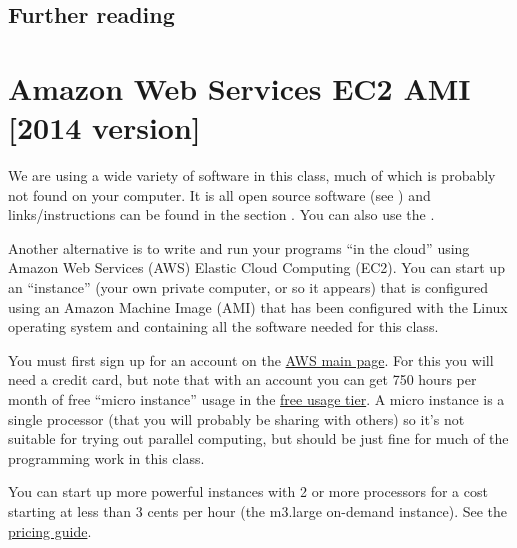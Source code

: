\documentclass[letterpaper,10pt,english]{sphinxmanual}
\begin{document}
\subsection{Further reading}
\label{vm:further-reading}
\label{vm:id2}{\hyperref[biblio:virtualbox]{\crossref{{[}VirtualBox{]}}}}
\label{vm:id3}{\hyperref[biblio:virtualbox\string-documentation]{}}


\section{Amazon Web Services EC2 AMI {[}2014 version{]}}
\label{aws:aws}\label{aws:amazon-web-services-ec2-ami-2014-version}\label{aws::doc}
We are using a wide variety of software in this class, much of which is
probably not found on your computer.  It is all open source software (see
) and links/instructions
can be found in the section {\hyperref[software_installation:software\string-installation]{}}.
You can also use the {\hyperref[vm:vm]{}}.

Another alternative is to write and run your programs ``in the cloud''
using Amazon Web Services (AWS) Elastic Cloud Computing (EC2).
You can start up an ``instance'' (your own private computer, or so it appears)
that is configured using an Amazon Machine Image (AMI) that has been
configured with the Linux operating system and containing
all the software needed for this class.

You must first sign up for an account  on the \href{http://aws.amazon.com/}{AWS main page}.  For this you will need a credit
card, but note that with an account you can get 750 hours per month of
free ``micro instance'' usage in the
\href{http://aws.amazon.com/free/}{free usage tier}.
A micro instance is a single processor (that you will probably be sharing
with others) so it's not suitable for trying out parallel computing, but
should be just fine for much of the programming work in this class.

You can start up more powerful instances with 2 or more processors for a cost
starting at less than 3 cents per hour (the m3.large on-demand
instance).  See the \href{http://aws.amazon.com/ec2/pricing/}{pricing guide}.
\end{document}
